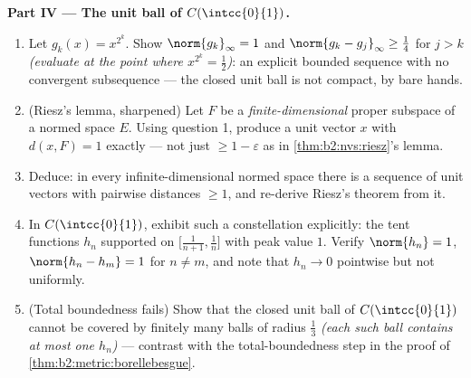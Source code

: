 \begin{problem}
\medskip
\noindent\textbf{Part IV --- The unit ball of
$C(\intcc{0}{1})$.}
\begin{enumerate}[resume]
  \item Let $g_k(x) = x^{2^k}$. Show $\norm{g_k}_\infty = 1$ and
        $\norm{g_k - g_j}_\infty \geq \frac14$ for $j > k$
        \emph{(evaluate at the point where $x^{2^k} =
        \frac12$)}: an explicit bounded sequence with no
        convergent subsequence --- the closed unit ball is not
        compact, by bare hands.
  \item (Riesz's lemma, sharpened) Let $F$ be a
        \emph{finite-dimensional} proper subspace of a normed
        space $E$. Using question 1, produce a unit vector $x$
        with $d(x, F) = 1$ exactly --- not just $\geq 1 -
        \varepsilon$ as in \cref{thm:b2:nvs:riesz}'s lemma.
  \item Deduce: in every infinite-dimensional normed space there
        is a sequence of unit vectors with pairwise distances
        $\geq 1$, and re-derive Riesz's theorem from it.
  \item In $C(\intcc{0}{1})$, exhibit such a constellation
        explicitly: the tent functions $h_n$ supported on
        $\bigl[\frac1{n+1}, \frac1n\bigr]$ with peak value $1$.
        Verify $\norm{h_n} = 1$, $\norm{h_n - h_m} = 1$ for $n
        \neq m$, and note that $h_n \to 0$ pointwise but not
        uniformly.
  \item (Total boundedness fails) Show that the closed unit ball
        of $C(\intcc{0}{1})$ cannot be covered by finitely many
        balls of radius $\frac13$ \emph{(each such ball contains
        at most one $h_n$)} --- contrast with the
        total-boundedness step in the proof of
        \cref{thm:b2:metric:borellebesgue}.
\end{enumerate}


\end{problem}
